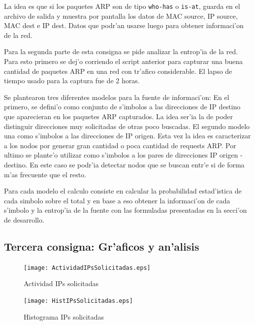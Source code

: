 \documentclass[a4paper,10pt]{article}
\begin{document}
La idea es que si los paquetes ARP son de tipo \texttt{who-has} o \texttt{is-at}, guarda en el archivo de salida y muestra por pantalla los datos de MAC source, IP source, MAC dest e IP dest. Datos que podr'an usarse luego para obtener informaci'on de la red.

\vspace*{5 mm}

Para la segunda parte de esta consigna se pide analizar la entrop'ia de la red. Para esto primero se dej'o corriendo el script anterior para capturar una buena cantidad de paquetes ARP en una red con tr'afico considerable. El lapso de tiempo usado para la captura fue de 2 horas. 

\vspace*{5 mm}

Se plantearon tres diferentes modelos para la fuente de informaci'on: En el primero, se defini'o como conjunto de s'imbolos a las direcciones de IP destino que aparecieran en los paquetes ARP capturados. La idea ser'ia la de poder distinguir direcciones muy solicitadas de otras poco buscadas. El segundo modelo una como s'imbolos a las direcciones de IP origen. Esta vez la idea es caracterizar a los nodos por generar gran cantidad o poca cantidad de requests ARP. Por ultimo se plante'o utilizar como s'imbolos a los pares de direcciones IP origen - destino. En este caso se podr'ia detectar nodos que se buscan entr'e si de forma m'as frecuente que el resto. 

\vspace*{5 mm}

Para cada modelo el calculo consiste en calcular la probabilidad estad'istica de cada simbolo sobre el total y en base a eso obtener la informaci'on de cada s'imbolo y la entrop'ia de la fuente con las formuladas presentadas en la secci'on de desarrollo.

\subsection{Tercera consigna: Gr'aficos y an'alisis}
\label{expli1:}

\begin{figure}[!hbp]
\begin{center}
\texttt{[image: ActividadIPsSolicitadas.eps]}
\end{center}
\caption{Actividad IPs solicitadas} \label{figura2}
\end{figure}

\begin{figure}[!hbp]
\begin{center}
\texttt{[image: HistIPsSolicitadas.eps]}
\end{center}
\caption{Histograma IPs solicitadas} \label{figura3}
\end{figure}
\end{document}
